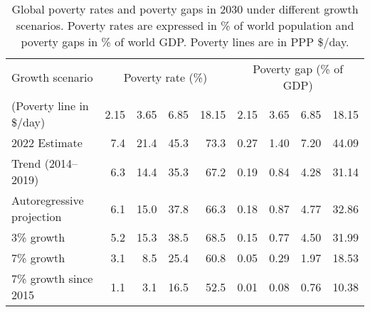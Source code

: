 \begin{table}[h]

\caption{\label{tab:poverty}Global poverty rates and poverty gaps in 2030 under different growth scenarios. Poverty rates are expressed in \% of world population and poverty gaps in \% of world GDP. Poverty lines are in PPP \$/day.}
\centering
\begin{tabular}[t]{lrrrrrrrr}
\toprule Growth scenario & \multicolumn{4}{c}{Poverty rate (\%)} & \multicolumn{4}{c}{Poverty gap (\% of GDP)} \\ 
 (Poverty line in \$/day)  & 2.15 & 3.65 & 6.85 & 18.15 & 2.15 & 3.65 & 6.85 & 18.15\\
\midrule
2022 Estimate & 7.4 & 21.4 & 45.3 & 73.3 & 0.27 & 1.40 & 7.20 & 44.09\\
Trend (2014--2019) & 6.3 & 14.4 & 35.3 & 67.2 & 0.19 & 0.84 & 4.28 & 31.14\\
Autoregressive projection & 6.1 & 15.0 & 37.8 & 66.3 & 0.18 & 0.87 & 4.77 & 32.86\\
3\% growth & 5.2 & 15.3 & 38.5 & 68.5 & 0.15 & 0.77 & 4.50 & 31.99\\
7\% growth & 3.1 & 8.5 & 25.4 & 60.8 & 0.05 & 0.29 & 1.97 & 18.53\\
7\% growth since 2015 & 1.1 & 3.1 & 16.5 & 52.5 & 0.01 & 0.08 & 0.76 & 10.38\\
\bottomrule
\end{tabular}
\end{table}